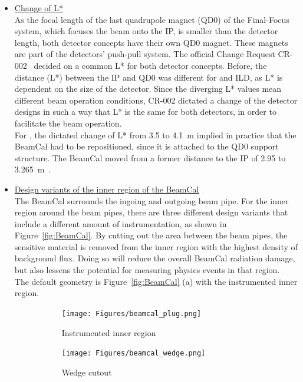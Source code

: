 \begin{itemize}
 \item \underline{Change of L*}\\
 As the focal length of the last quadrupole magnet (QD0) of the Final-Focus system, which focuses the beam onto the IP, is smaller than the detector length, both detector concepts have their own QD0 magnet.
 These magnets are part of the detectors' push-pull system.
 The official Change Request CR-002~\cite{CR-002} decided on a common L* for both detector concepts.
 Before, the distance (L*) between the IP and QD0 was different for \sid and ILD, as L* is dependent on the size of the detector.
 Since the diverging L* values mean different beam operation conditions, CR-002 dictated a change of the detector designs in such a way that L* is the same for both detectors, in order to facilitate the beam operation.
 \\For \sid, the dictated change of L* from 3.5 to \SI{4.1}{\meter} implied in practice that the BeamCal had to be repositioned, since it is attached to the QD0 support structure. 
 The BeamCal moved from a former distance to the IP of 2.95 to \SI{3.265}{\meter}~\cite{SiDBkgNote}.
 \item \underline{Design variants of the inner region of the BeamCal}\\
 The BeamCal surrounds the ingoing and outgoing beam pipe.
 For the inner region around the beam pipes, there are three different design variants that include a different amount of instrumentation, as shown in Figure~\ref{fig:BeamCal}.
 By cutting out the area between the beam pipes, the sensitive material is removed from the inner region with the highest density of background flux.
 Doing so will reduce the overall BeamCal radiation damage, but also lessens the potential for measuring physics events in that region.
 \\The default geometry is Figure~\ref{fig:BeamCal} (a) with the instrumented inner region.
 \begin{figure}
 \centering
  \begin{subfigure}[b]{0.3\textwidth}
   \centering
    \texttt{[image: Figures/beamcal\_plug.png]}
   \caption{Instrumented inner region}
  \end{subfigure}
  \begin{subfigure}[b]{0.3\textwidth}
   \centering
    \texttt{[image: Figures/beamcal\_wedge.png]}
   \caption{Wedge cutout}
   \end{subfigure}
    \begin{subfigure}[b]{0.3\textwidth}

\end{subfigure}
\end{figure}
\end{itemize}
